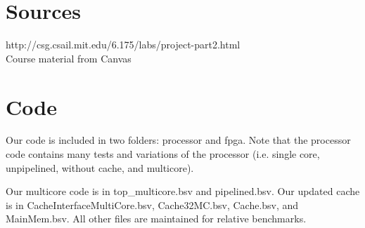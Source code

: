 \documentclass{article}
\begin{document}






\section{Sources}

http://csg.csail.mit.edu/6.175/labs/project-part2.html
\\
Course material from Canvas

\section{Code}

Our code is included in two folders: processor and fpga. Note that the processor code contains many tests and variations of the processor (i.e. single core, unpipelined, without cache, and multicore). 

Our multicore code is in top\_multicore.bsv and pipelined.bsv. Our updated cache is in CacheInterfaceMultiCore.bsv, Cache32MC.bsv, Cache.bsv, and MainMem.bsv. All other files are maintained for relative benchmarks.
\end{document}

